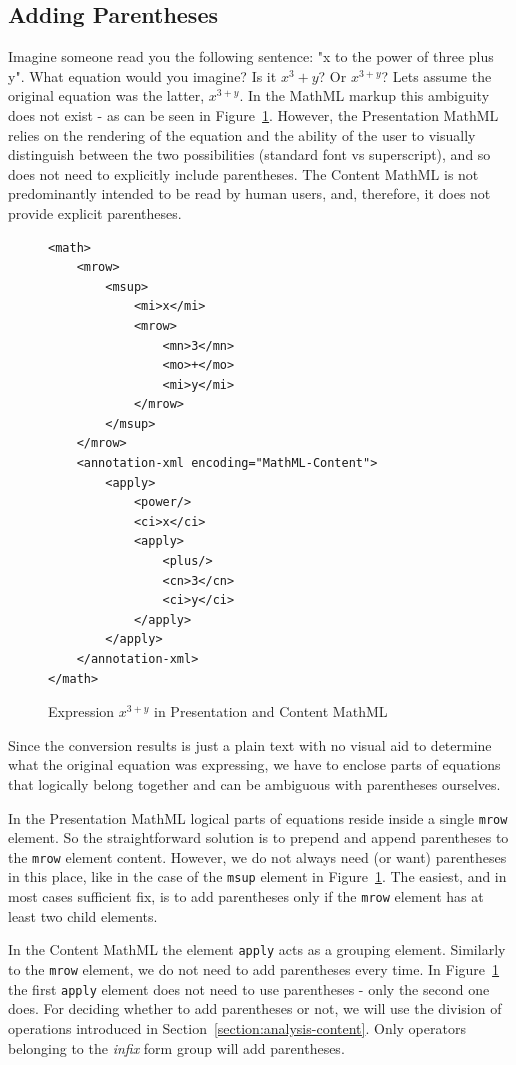 \documentclass[11pt,oneside,final]{fithesis2}
\begin{document}
\subsection{Adding Parentheses}
Imagine someone read you the following sentence: "x to the power of three plus y". What equation would you imagine? Is it $x^{3} + y$? Or $x^{3+y}$? Lets assume the original equation was the latter, $x^{3+y}$. In the MathML markup this ambiguity does not exist - as can be seen in Figure~\ref{fig:addingbraces}. However, the Presentation MathML relies on the rendering of the equation and the ability of the user to visually distinguish between the two possibilities (standard font vs superscript), and so does not need to explicitly include parentheses. The Content MathML is not predominantly intended to be read by human users, and, therefore, it does not provide explicit parentheses.

\begin{figure}[!ht]
\lstset{language=XML,frame=lines}
\begin{lstlisting}
<math>
	<mrow>
		<msup>
			<mi>x</mi>
			<mrow>
				<mn>3</mn>
				<mo>+</mo>
				<mi>y</mi>
			</mrow>
		</msup>
	</mrow>
	<annotation-xml encoding="MathML-Content">
		<apply>
			<power/>
			<ci>x</ci>
			<apply>
				<plus/>
				<cn>3</cn>
				<ci>y</ci>
			</apply>
		</apply>
	</annotation-xml>
</math>
\end{lstlisting}
\caption{Expression $x^{3+y}$ in Presentation and Content MathML}
\label{fig:addingbraces}
\end{figure}

Since the conversion results is just a plain text with no visual aid to determine what the original equation was expressing, we have to enclose parts of equations that logically belong together and can be ambiguous with parentheses ourselves. 

In the Presentation MathML logical parts of equations reside inside a single \texttt{mrow} element. So the straightforward solution is to prepend and append parentheses to the \texttt{mrow} element content. However, we do not always need (or want) parentheses in this place, like in the case of the \texttt{msup} element in Figure~\ref{fig:addingbraces}. The easiest, and in most cases sufficient fix, is to add parentheses only if the \texttt{mrow} element has at least two child elements.

In the Content MathML the element \texttt{apply} acts as a grouping element. Similarly to the \texttt{mrow} element, we do not need to add parentheses every time. In Figure~\ref{fig:addingbraces} the first \texttt{apply} element does not need to use parentheses - only the second one does. For deciding whether to add parentheses or not, we will use the division of operations introduced in Section~\ref{section:analysis-content}. Only operators belonging to the \textit{infix} form group will add parentheses.
\end{document}
